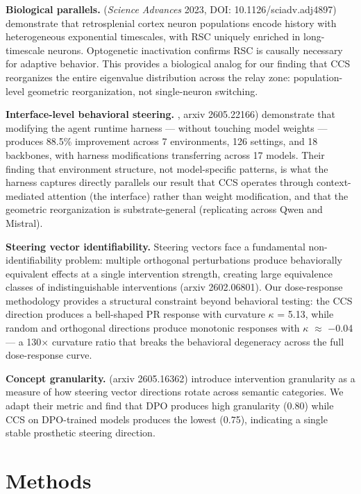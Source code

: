 \documentclass[11pt]{article}
\begin{document}
\textbf{Biological parallels.} \citet{danskin2023retrosplenial} (\textit{Science Advances} 2023, DOI: 10.1126/sciadv.adj4897) demonstrate that retrosplenial cortex neuron populations encode history with heterogeneous exponential timescales, with RSC uniquely enriched in long-timescale neurons. Optogenetic inactivation confirms RSC is causally necessary for adaptive behavior. This provides a biological analog for our finding that CCS reorganizes the entire eigenvalue distribution across the relay zone: population-level geometric reorganization, not single-neuron switching.

\textbf{Interface-level behavioral steering.} \citet{putta2025adapt}, arxiv 2605.22166) demonstrate that modifying the agent runtime harness --- without touching model weights --- produces 88.5\% improvement across 7 environments, 126 settings, and 18 backbones, with harness modifications transferring across 17 models. Their finding that environment structure, not model-specific patterns, is what the harness captures directly parallels our result that CCS operates through context-mediated attention (the interface) rather than weight modification, and that the geometric reorganization is substrate-general (replicating across Qwen and Mistral).

\textbf{Steering vector identifiability.} Steering vectors face a fundamental non-identifiability problem: multiple orthogonal perturbations produce behaviorally equivalent effects at a single intervention strength, creating large equivalence classes of indistinguishable interventions (arxiv 2602.06801). Our dose-response methodology provides a structural constraint beyond behavioral testing: the CCS direction produces a bell-shaped PR response with curvature $\kappa$ = 5.13, while random and orthogonal directions produce monotonic responses with $\kappa$ $\approx$ $-$0.04 --- a 130$\times$ curvature ratio that breaks the behavioral degeneracy across the full dose-response curve.

\textbf{Concept granularity.} \citet{robertson2025grace} (arxiv 2605.16362) introduce intervention granularity as a measure of how steering vector directions rotate across semantic categories. We adapt their metric and find that DPO produces high granularity (0.80) while CCS on DPO-trained models produces the lowest (0.75), indicating a single stable prosthetic steering direction.

\section{Methods}
\end{document}
